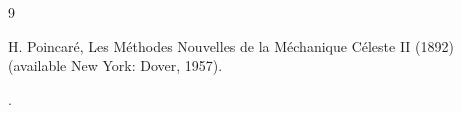 \documentclass[english,reqno]{amsart}
\numberwithin{equation}{section}
\theoremstyle{plain}
\theoremstyle{definition}
\theoremstyle{remark}
\begin{document}
\begin{thebibliography}{9}


 H. Poincar\'e,   Les M\'ethodes Nouvelles de la M\'echanique C\'eleste II (1892) (available New York: Dover, 1957).




.




































\end{thebibliography}
\end{document}

